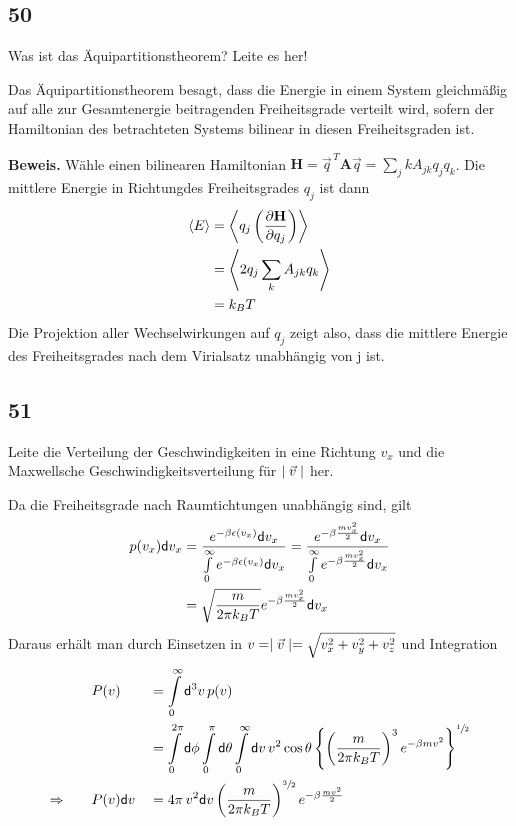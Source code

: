 \subsection{50}
\begin{myfrag}
Was ist das Äquipartitionstheorem? Leite es her!
\end{myfrag}
Das Äquipartitionstheorem besagt, dass die Energie in einem System gleichmäßig auf alle zur Gesamtenergie beitragenden Freiheitsgrade verteilt wird, sofern der Hamiltonian des betrachteten Systems bilinear in diesen Freiheitsgraden ist.
\par\textbf{Beweis.} Wähle einen bilinearen Hamiltonian $\mathbf{H}=\vec{q}^{\,T}\mathbf{A}\vec{q}=\sum\limits_jk A_{jk}q_jq_k$. Die mittlere Energie \glqq in Richtung\grqq des Freiheitsgrades $q_j$ ist dann 
\begin{align}
	\langle E\rangle&=\left\langle q_j\left(\frac{\partial \mathbf{H}}{\partial q_j}\right)\right\rangle\\
	&=\left\langle 2q_j\sum\limits_k A_{jk}q_k\right\rangle\\
	&=k_BT\nonumber
\end{align} 
Die Projektion aller Wechselwirkungen auf $q_j$ zeigt also, dass die mittlere Energie des Freiheitsgrades nach dem Virialsatz unabhängig von j ist.
\subsection{51}
\begin{myfrag}
Leite die Verteilung der Geschwindigkeiten in eine Richtung $v_x$ und die
Maxwellsche Geschwindigkeitsverteilung für $\mid \vec{v} \mid$ her.
\end{myfrag}
Da die Freiheitsgrade nach Raumtichtungen unabhängig sind, gilt
\begin{align}
p(v_x)\mathsf{d} v_x&=\frac{e^{-\beta\epsilon(v_x)}\mathsf{d} v_x}{\int\limits_0^\infty e^{-\beta\epsilon(v_x)}\mathsf{d} v_x}=\frac{e^{-\beta\frac{mv_x^2}{2}}\mathsf{d} v_x}{\int\limits_0^\infty e^{-\beta\frac{mv_x^2}{2}}\mathsf{d} v_x}\\&=\sqrt{\frac{m}{2\pi k_BT}}e^{-\beta\frac{mv_x^2}{2}}\mathsf{d} v_x
\end{align}
Daraus erhält man durch Einsetzen in $v=\mid \vec{v} \mid=\sqrt{v_x^2+v_y^2+v_z^2}$ und Integration
\begin{alignat}{2}
&P(v)&&=\int\limits_0^\infty\mathsf{d}^3v\,p(v)\\
&&&=\int\limits_0^{2\pi}\mathsf{d}\phi\int\limits_0^\pi\mathsf{d}\theta\int\limits_0^\infty\mathsf{d} v\,v^2\cos\theta\left\lbrace\left(\frac{m}{2\pi k_BT}\right)^3e^{-\beta mv^2}\right\rbrace^{\sfrac{1}{2}}\\
\Rightarrow\qquad&P(v)\mathsf{d} v&&=4\pi\,v^2\mathsf{d} v\left(\frac{m}{2\pi k_BT}\right)^{\sfrac{3}{2}}e^{-\beta\frac{mv^2}{2}}\label{eq:dichtefkt}
\end{alignat}

